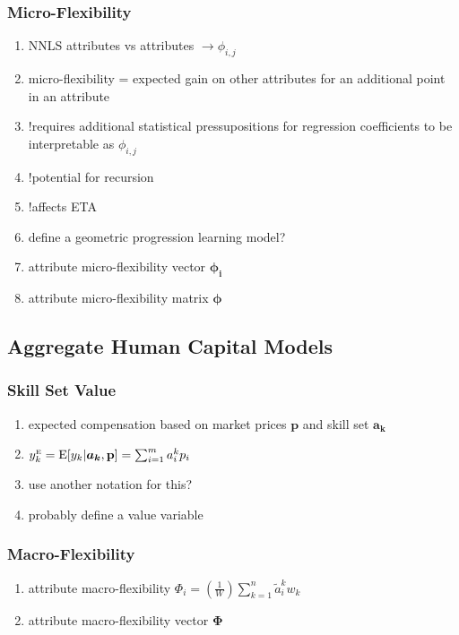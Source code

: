 \documentclass{elsarticle} %
\begin{document}
\subsubsection{Micro-Flexibility}
\begin{enumerate}
    \item NNLS attributes vs attributes $\rightarrow \phi_{i,j}$
    \item micro-flexibility = expected gain on other attributes for an additional point
          in an attribute
    \item !requires additional statistical pressupositions for regression coefficients to be interpretable as $\phi_{i,j}$
    \item !potential for recursion
    \item !affects ETA
    \item define a geometric progression learning model?
    \item attribute micro-flexibility vector $\boldsymbol{\phi_{i}}$
    \item attribute micro-flexibility matrix $\boldsymbol{\phi}$
\end{enumerate}

\subsection{Aggregate Human Capital Models}
\subsubsection{Skill Set Value}
\begin{enumerate}
    \item expected compensation based on market prices $\textbf{p}$ and skill set
          $\boldsymbol{a_k}$
    \item $y_{k}^{\text{\tiny{E}}} = \text{E}[y_k | \boldsymbol{a_k}, \textbf{p}] = \sum_{i=1}^{m}{a_{i}^{k} p_i}$
    \item use another notation for this?
    \item probably define a value variable 
\end{enumerate}

\subsubsection{Macro-Flexibility}
\begin{enumerate}
    \item attribute macro-flexibility $\Phi_i = \left( \frac{1}{W} \right)
              \sum_{k=1}^{n}{\tilde{a}_{i}^{k} w_k}$
    \item attribute macro-flexibility vector $\boldsymbol{\Phi}$
\end{enumerate}
\end{document}
